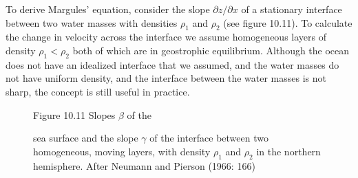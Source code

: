 To derive Margules' equation, consider the slope $\partial z/\partial
x$ of a stationary interface between two water masses with densities
$\rho_1$ and $\rho_2$ (see figure 10.11). To calculate the change in
velocity across the interface we assume homogeneous layers of density
$\rho_1 < \rho_2$ both of which are in geostrophic
equilibrium. Although the ocean does not have an idealized interface
that we assumed, and the water masses do not have uniform density, and
the interface between the water masses is not sharp, the concept is
still useful in practice.

\begin{figure}[t!]
{}
\footnotesize
Figure 10.11 Slopes $\beta$ of the \rule{0mm}{4ex}sea surface and the
slope $\gamma$ of the interface between two homogeneous, moving
layers, with density $\rho_1$ and $\rho_2$ in the northern
hemisphere. After Neumann and Pierson (1966: 166)

\label{fig:Fig10-10}
\vspace{-3ex}
\end{figure}


